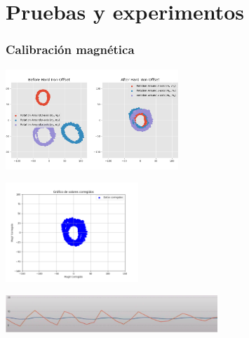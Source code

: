 \documentclass{beamer}
\begin{document}
\section{Pruebas y experimentos}
\begin{frame}
\frametitle{Calibración magnética}
\centering

\begin{minipage}{0.45\textwidth}
    \centering
    \includegraphics[width=6.5cm]{figs/hard_iron_calibration.png}
\end{minipage}
\hfill
\begin{minipage}{0.45\textwidth}
    \centering
    \includegraphics[width=5.0cm]{figs/soft_iron_calibration.png}
\end{minipage}

\vspace{0.5cm} %

\begin{minipage}{0.7\textwidth}
    \centering
    \includegraphics[width=8.0cm]{figs/low.png} %
\end{minipage}
\hfill


\end{frame}
\end{document}

